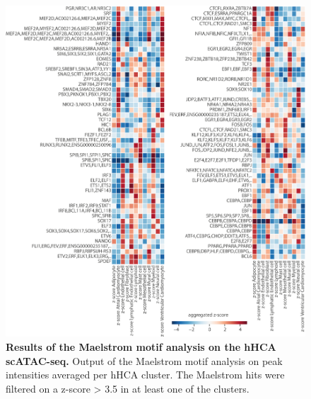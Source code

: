 \begin{figure}
    \centering
    \includegraphics[width=\linewidth]{ch.scepia/imgs/Maelstrom_AllHitsAbove3.5_Myriad_SuppFigMaelstromHM.png}
    \caption{\textbf{Results of the Maelstrom motif analysis on the hHCA scATAC-seq.} Output of the Maelstrom motif analysis on peak intensities averaged per hHCA cluster. The Maelstrom hits were filtered on a z-score > 3.5 in at least one of the clusters.}
    \label{fig:scepia_maelstromhm}
\end{figure}

